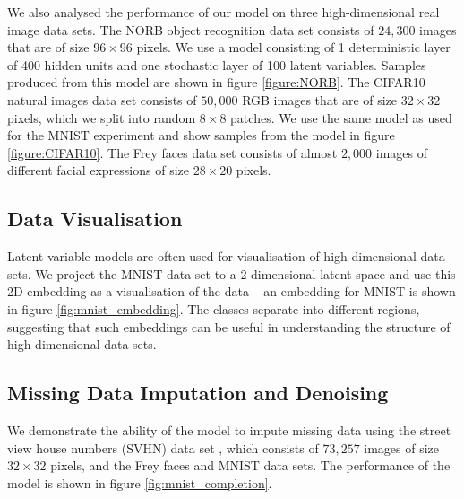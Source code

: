 \documentclass{article}
\begin{document}
\begin{bibunit}[icml2013]
We also analysed the performance of our model on three high-dimensional 
real image data sets. The NORB object recognition data set consists of 
$24,300$ images that are of size $96 \times 96$ pixels. We use a 
model consisting of 1 deterministic layer of 400 hidden units and 
one stochastic layer of 100 latent variables. Samples produced from this 
model are shown in figure \ref{figure:NORB}. The CIFAR10 natural images 
data set consists of $50,000$ RGB images that are of size $32 
\times 32$ pixels, which we split into random $8 \times 8$ patches. We use 
the same 
model as used for the MNIST experiment and show samples from the model 
in figure \ref{figure:CIFAR10}. The Frey faces data set consists of almost 
$2,000$ images of different facial expressions
of size 
$28 \times 20$ pixels. 

\subsection{Data Visualisation}
Latent variable models are often 
used for visualisation of 
high-dimensional data sets. We project the MNIST data set to a 
2-dimensional latent space and use this 2D embedding as a visualisation 
of the data --  an embedding for MNIST is shown in 
figure \ref{fig:mnist_embedding}. The classes separate into different 
regions,  suggesting that such embeddings can be useful in understanding the structure of high-dimensional data sets.

\subsection{Missing Data Imputation and Denoising}
We demonstrate the ability of the model to impute missing data using the street view house numbers (SVHN) data set \citep{SVHNdata}, which consists of $73,257$ images of size $32 \times 32$ pixels, and the Frey faces and MNIST data sets. The performance of the model is shown in figure \ref{fig:mnist_completion}. 


\end{bibunit}
\end{document}
